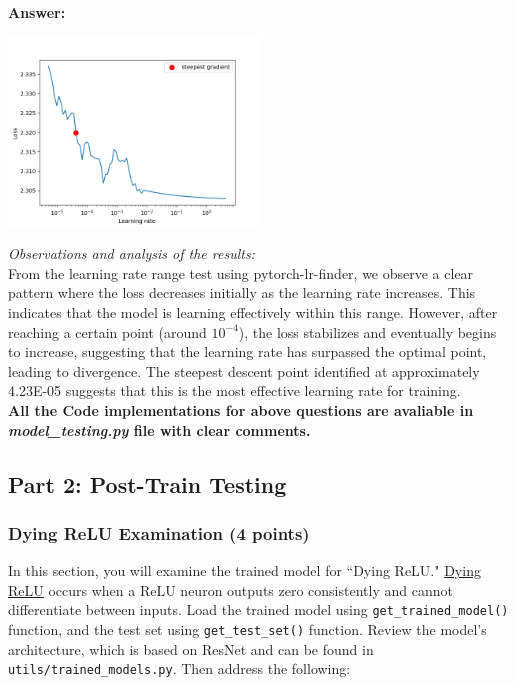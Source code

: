 \documentclass[11pt, oneside]{article}   	%
\begin{document}
\textbf{Answer:} \\
\begin{center}
    \includegraphics[width=0.5\textwidth]{p1lr_pic/learningRate.png}
\end{center}

\textit{Observations and analysis of the results: }
\\
From the learning rate range test using pytorch-lr-finder, we observe a clear pattern where the loss decreases initially as the learning rate increases. This indicates that the model is learning effectively within this range. However, after reaching a certain point (around $10^{-4}$), the loss stabilizes and eventually begins to increase, suggesting that the learning rate has surpassed the optimal point, leading to divergence. The steepest descent point identified at approximately 4.23E-05 suggests that this is the most effective learning rate for training.
\\
\textbf{All the Code implementations for above questions are avaliable in \textit{model\_testing.py} file with clear comments.}

\subsection*{Part 2: Post-Train Testing}

\subsubsection*{Dying ReLU Examination (4 points)}
In this section, you will examine the trained model for ``Dying ReLU." \href{https://datascience.stackexchange.com/questions/5706/what-is-the-dying-relu-problem-in-neural-networks}{Dying ReLU} occurs when a ReLU neuron outputs zero consistently and cannot differentiate between inputs. 
Load the trained model using \texttt{get\_trained\_model()} function, and the test set using \texttt{get\_test\_set()} function. Review the model's architecture, which is based on ResNet and can be found in \texttt{utils/trained\_models.py}. Then address the following:
\end{document}
